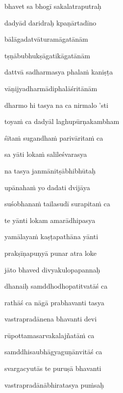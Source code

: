 \nemslokad 
bhavet sa bhogī sakalatraputraḥ \veg\dontdisplaylinenum

\ujvers\nemsloka 
dadyād daridraḥ kpaṇārtadīno
\dontdisplaylinenum

\nemslokab 
bālāgadatvāturamāgatānām \danda\dontdisplaylinenum

\nemslokac 
tṣṇābubhukṣāgatikāgatānām
\dontdisplaylinenum

\nemslokad 
dattvā sadharmasya phalaṁ kaniṣṭa \veg\dontdisplaylinenum

\ujvers\nemsloka 
vāṇijyadharmādiphalāśritānām
\dontdisplaylinenum

\nemslokab 
dharmo hi tasya na ca nirmalo 'sti \danda\dontdisplaylinenum

\nemslokac 
toyaṁ ca dadyāl laghupūrṇakambham
\dontdisplaylinenum

\nemslokad 
śītaṁ sugandhaṁ parivāritaṁ ca \veg\dontdisplaylinenum

\ujvers\nemsloka 
sa yāti lokaṁ salileśvarasya
\dontdisplaylinenum

\nemslokab 
na tasya janmānitṣābhibhūtaḥ \danda\dontdisplaylinenum

\nemslokac 
upānahaṁ yo dadati dvijāya
\dontdisplaylinenum

\nemslokad 
suśobhanaṁ tailasudī surapitaṁ ca \veg\dontdisplaylinenum

\ujvers\nemsloka 
te yānti lokam amarādhipasya
\dontdisplaylinenum

\nemslokab 
yamālayaṁ kaṣṭapathāna yānti \danda\dontdisplaylinenum

\nemslokac 
prakṣīṇapuṇyā punar atra loke
\dontdisplaylinenum

\nemslokad 
jāto bhaved divyakulopapannaḥ \veg\dontdisplaylinenum

\ujvers\nemsloka 
dhanaiḥ samddhodhopatitvatāś ca
\dontdisplaylinenum

\nemslokab 
rathāś ca nāgā prabhavanti tasya \danda\dontdisplaylinenum

\nemslokac 
vastrapradānena bhavanti devi
\dontdisplaylinenum

\nemslokad 
rūpottamasarvakalajñatāṁ ca \veg\dontdisplaylinenum

\ujvers\nemsloka 
samddhisaubhāgyaguṇānvitāś ca
\dontdisplaylinenum

\nemslokab 
svargacyutās te puruṣā bhavanti \danda\dontdisplaylinenum

\nemslokac 
vastrapradānābhiratasya puṁsaḥ
\dontdisplaylinenum

